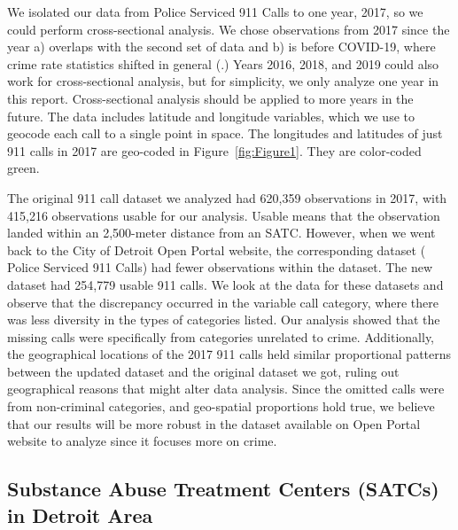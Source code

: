 \documentclass[12pt]{article}
\begin{document}
We isolated our data from Police Serviced 911 Calls to one year, 2017, so we could perform cross-sectional analysis. We chose observations from 2017 since the year a) overlaps with the second set of data and b) is before COVID-19, where crime rate statistics shifted in general (\citealp{covid_and_crime}.)  Years 2016, 2018, and 2019 could also work for cross-sectional analysis, but for simplicity, we only analyze one year in this report. Cross-sectional analysis should be applied to more years in the future. The data includes latitude and longitude variables, which we use to geocode each call to a single point in space. The longitudes and latitudes of just 911 calls in 2017 are geo-coded in Figure~\ref{fig:Figure1}. They are color-coded green. 

The original 911 call dataset we analyzed had 620,359 observations in 2017, with 415,216 observations usable for our analysis.  Usable means that the observation landed within an 2,500-meter distance from an SATC. However, when we went back to the City of Detroit Open Portal website, the corresponding dataset ( Police Serviced 911 Calls) had fewer observations within the dataset. The new dataset had 254,779 usable 911 calls. We look at the data for these datasets and observe that the discrepancy occurred in the variable call category, where there was less diversity in the types of categories listed. Our analysis showed that the missing calls were specifically from categories unrelated to crime.  Additionally, the geographical locations of the 2017 911 calls held similar proportional patterns between the updated dataset and the original dataset we got, ruling out geographical reasons that might alter data analysis. Since the omitted calls were from non-criminal categories, and geo-spatial proportions hold true, we believe that our results will be more robust in the dataset available on Open Portal website to analyze since it focuses more on crime.\footnotemark[1]

\subsection{Substance Abuse Treatment Centers (SATCs) in Detroit Area}
\end{document}
